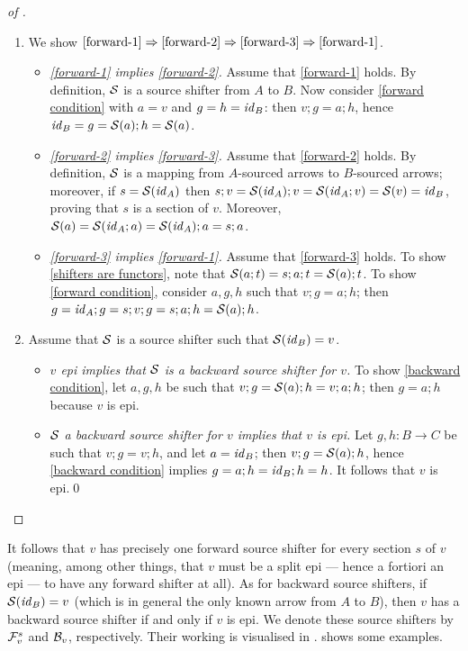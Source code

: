 \begin{fullorname}
\begin{proof}[of ]
\begin{enumerate}[topsep=\smallskipamount]
\item
We show $\ref{forward-1} \Rightarrow \ref{forward-2} \Rightarrow \ref{forward-3} \Rightarrow \ref{forward-1}$.
\begin{itemize}
\item \emph{\ref{forward-1} implies \ref{forward-2}.}
%
Assume that \ref{forward-1} holds. By definition, $\mathcal{S}$ is a source shifter from $A$ to $B$. Now consider \eqref{forward condition} with $a=v$ and $g=h=\mathit{id}_B$: then $v;g=a;h$, hence $\mathit{id}_B=g = \mathcal{S}(a);h=\mathcal{S}(a)$.

\item \emph{\ref{forward-2} implies \ref{forward-3}.}
%
Assume that \ref{forward-2} holds. By definition, $\mathcal{S}$ is a mapping from $A$-sourced arrows to $B$-sourced arrows; moreover, if $s=\mathcal{S}(\mathit{id}_A)$ then $s;v=\mathcal{S}(\mathit{id}_A);v=\mathcal{S}(\mathit{id}_A;v)=\mathcal{S}(v)=\mathit{id}_B$, proving that $s$ is a section of $v$. Moreover, $\mathcal{S}(a)=\mathcal{S}(\mathit{id}_A;a)=\mathcal{S}(\mathit{id}_A);a=s;a$.

\item \emph{\ref{forward-3} implies \ref{forward-1}.}
%
Assume that \ref{forward-3} holds. To show \eqref{shifters are functors}, note that $\mathcal{S}(a;t)=s;a;t=\mathcal{S}(a);t$. To show \eqref{forward condition}, consider $a,g,h$ such that $v;g=a;h$; then $g=\mathit{id}_A;g=s;v;g=s;a;h = \mathcal{S}(a);h$.
\end{itemize}

\item Assume that $\mathcal{S}$ is a source shifter such that $\mathcal{S}(\mathit{id}_B)=v$.
\begin{itemize}
\item \emph{$v$ epi implies that $\mathcal{S}$ is a backward source shifter for $v$.} To show \eqref{backward condition}, let $a,g,h$ be such that $v;g=\mathcal{S}(a);h=v;a;h$; then $g=a;h$ because $v$ is epi.

\item \emph{$\mathcal{S}$ a backward source shifter for $v$ implies that $v$ is epi.} Let $g,h:B\to C$ be such that $v;g=v;h$, and let $a=\mathit{id}_B$; then $v;g=\mathcal{S}(a);h$, hence \eqref{backward condition} implies $g=a;h=\mathit{id}_B;h=h$. It follows that $v$ is epi.\qed
\end{itemize}
\end{enumerate}
\end{proof}
\end{fullorname}
%
It follows that $v$ has precisely one forward source shifter for every section $s$ of $v$ (meaning, among other things, that $v$ must be a split epi --- hence a fortiori an epi --- to have any forward shifter at all). As for backward source shifters, if $\mathcal{S}(\mathit{id}_B)=v$ (which is in general the only known arrow from $A$ to $B$), then $v$ has a backward source shifter if and only if $v$ is epi. We denote these source shifters by $\mathcal{F}_v^s$ and $\mathcal{B}_v$, respectively. Their working is visualised in .  shows some examples.

